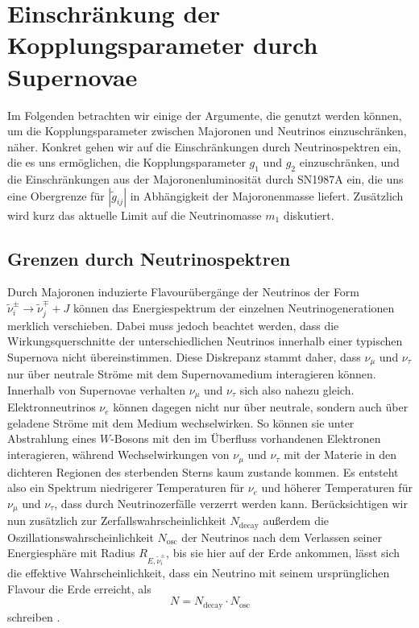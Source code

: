 
\chapter{Einschränkung der Kopplungsparameter durch Supernovae}

Im Folgenden betrachten wir einige der Argumente, die genutzt werden können, um die Kopplungsparameter zwischen Majoronen und Neutrinos einzuschränken, näher.
Konkret gehen wir auf die Einschränkungen durch Neutrinospektren ein, die es uns ermöglichen, die Kopplungsparameter $g_1$ und $g_2$ einzuschränken, und die Einschränkungen aus der Majoronenluminosität durch SN1987A ein,
die uns eine Obergrenze für $|\tilde{g}_{i j}|$ in Abhängigkeit der Majoronenmasse liefert.
Zusätzlich wird kurz das aktuelle Limit auf die Neutrinomasse $m_1$ diskutiert.

\section{Grenzen durch Neutrinospektren}
\label{subsec:spektrengrenzen}

Durch Majoronen induzierte Flavourübergänge der Neutrinos der Form $\tilde{\nu}^\pm_i \rightarrow \tilde{\nu}^\mp_j + J$ können das Energiespektrum der einzelnen Neutrinogenerationen merklich verschieben. 
Dabei muss jedoch beachtet werden, dass die Wirkungsquerschnitte der unterschiedlichen Neutrinos innerhalb einer typischen Supernova nicht übereinstimmen.
Diese Diskrepanz stammt daher, dass $\nu_\mu$ und $\nu_\tau$ nur über neutrale Ströme mit dem Supernovamedium interagieren können.
Innerhalb von Supernovae verhalten $\nu_\mu$ und $\nu_\tau$ sich also nahezu gleich.
Elektronneutrinos $\nu_e$ können dagegen nicht nur über neutrale, sondern auch über geladene Ströme mit dem Medium wechselwirken.
So können sie unter Abstrahlung eines $W$-Bosons mit den im Überfluss vorhandenen Elektronen interagieren, während Wechselwirkungen von $\nu_\mu$ und $\nu_\tau$ mit der Materie in den dichteren Regionen des sterbenden Sterns kaum zustande kommen.
Es entsteht also ein Spektrum niedrigerer Temperaturen für $\nu_e$ und höherer Temperaturen für $\nu_\mu$ und $\nu_\tau$, dass durch Neutrinozerfälle verzerrt werden kann.
Berücksichtigen wir nun zusätzlich zur Zerfallswahrscheinlichkeit $N_\text{decay}$ außerdem die Oszillationswahrscheinlichkeit $N_\text{osc}$ der Neutrinos nach dem Verlassen seiner Energiesphäre mit Radius $R_{E, \tilde{\nu}^\pm_i}$, 
bis sie hier auf der Erde ankommen, lässt sich die effektive Wahrscheinlichkeit, dass ein Neutrino mit seinem ursprünglichen Flavour die Erde erreicht, als
\begin{equation}
    N = N_\text{decay} \cdot N_\text{osc}
    \label{eq:survivalprob}
\end{equation}
schreiben \cite{supernovaboundsdasandere}.

